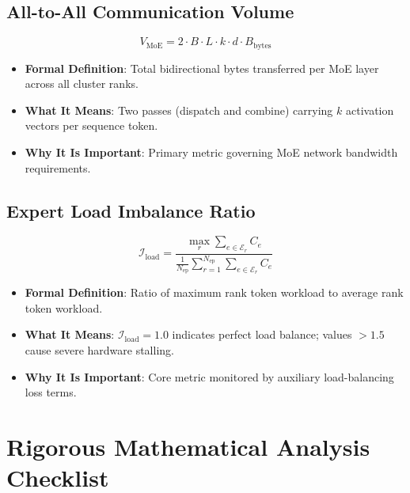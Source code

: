 \documentclass[11pt,a4paper]{article}
\theoremstyle{definition}
\begin{document}
\subsection{All-to-All Communication Volume}
{\boldmath
\begin{equation}
V_{\text{MoE}} = 2 \cdot B \cdot L \cdot k \cdot d \cdot B_{\text{bytes}}
\end{equation}
}
\begin{itemize}
    \item \textbf{Formal Definition}: Total bidirectional bytes transferred per MoE layer across all cluster ranks.
    \item \textbf{What It Means}: Two passes (dispatch and combine) carrying $k$ activation vectors per sequence token.
    \item \textbf{Why It Is Important}: Primary metric governing MoE network bandwidth requirements.
\end{itemize}

\subsection{Expert Load Imbalance Ratio}
{\boldmath
\begin{equation}
\mathcal{I}_{\text{load}} = \frac{\max_r \sum_{e \in \mathcal{E}_r} C_e}{\frac{1}{N_{\text{ep}}} \sum_{r=1}^{N_{\text{ep}}} \sum_{e \in \mathcal{E}_r} C_e}
\end{equation}
}
\begin{itemize}
    \item \textbf{Formal Definition}: Ratio of maximum rank token workload to average rank token workload.
    \item \textbf{What It Means}: $\mathcal{I}_{\text{load}} = 1.0$ indicates perfect load balance; values $>1.5$ cause severe hardware stalling.
    \item \textbf{Why It Is Important}: Core metric monitored by auxiliary load-balancing loss terms.
\end{itemize}

\section{Rigorous Mathematical Analysis Checklist}
\end{document}
